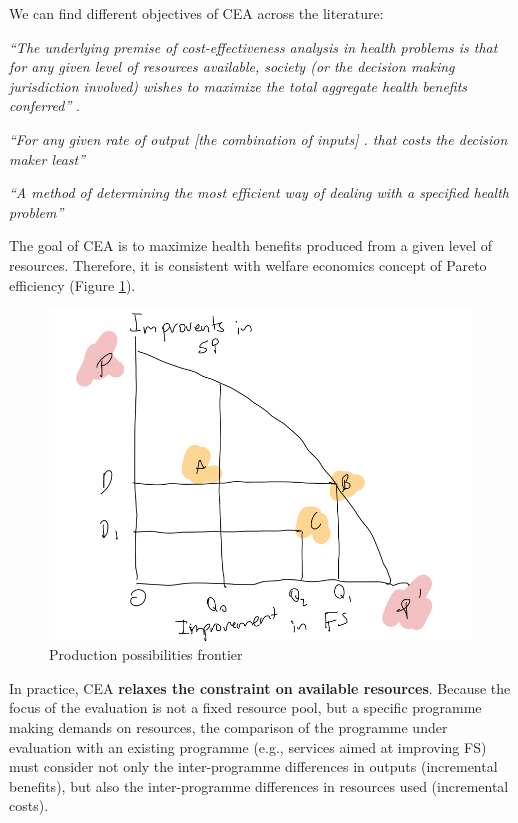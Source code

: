 \documentclass[
]{book}
\begin{document}
We can find different objectives of CEA across the literature:

\emph{``The underlying premise of cost-effectiveness analysis in health problems is that for any given level of resources available, society (or the decision making jurisdiction involved) wishes to maximize the total aggregate health benefits conferred''} \citet{weinstein1977foundations}.

\emph{``For any given rate of output {[}the combination of inputs{]} . that costs the decision maker least''} \citet{culyer1980political}

\emph{``A method of determining the most efficient way of dealing with a specified health problem''} \citet{green1988priority}

The goal of CEA is to maximize health benefits produced from a given level of resources. Therefore, it is consistent with welfare economics concept of Pareto efficiency \citep{birch1992cost} (Figure \ref{fig:fig1}).

\begin{figure}

{\centering \includegraphics[width=11.58in]{images/fig1} 

}

\caption{Production possibilities frontier}\label{fig:fig1}
\end{figure}

In practice, CEA \textbf{relaxes the constraint on available resources}. Because the focus of the evaluation is not a fixed resource pool, but a specific programme making demands on resources, the comparison of the programme under evaluation with an existing programme (e.g., services aimed at improving FS) must consider not only the inter-programme differences in outputs (incremental benefits), but also the inter-programme differences in resources used (incremental costs).
\end{document}
